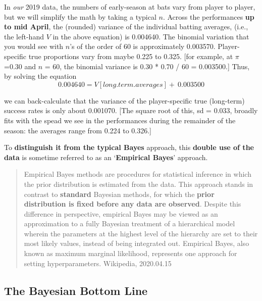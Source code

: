 \documentclass[]{book}
\begin{document}
In \emph{our} 2019 data, the numbers of early-season at bats vary from player to player, but we will simplify the math by taking a typical \(n\).
Across the performances \textbf{up to mid April}, the (rounded) variance of the individual batting averages, (i.e., the left-hand \(V\) in the above equation) is 0.004640. The binomial variation that you would see with \(n\)'s of the order of 60 is approximately 0.003570. Player-specific true proportions vary from maybe 0.225 to 0.325. {[}for example, at \(\pi\) =0.30 and \(n\) = 60, the binomial variance is 0.30 * 0.70 / 60 = 0.003500.{]} Thus,
by solving the equation
\[0.004640 =  V[long.term.averages] +  \  0.003500\]

we can back-calculate that the variance of the player-specific true (long-term) success rates is only about 0.001070. {[}The square root of this, sd = 0.033, broadly fits with the spead we see in the performances during the remainder of the season: the averages range from 0.224 to 0.326.{]}

To \textbf{distinguish it from the typical Bayes} approach, this \textbf{double use of the data} is sometime referred to as an `\textbf{Empirical Bayes}' approach.

\begin{quote}
Empirical Bayes methods are procedures for statistical inference in which the prior distribution is estimated from the data. This approach stands in contrast to \textbf{standard} Bayesian methods, for which the \textbf{prior distribution is fixed before any data are observed}. Despite this difference in perspective, empirical Bayes may be viewed as an approximation to a fully Bayesian treatment of a hierarchical model wherein the parameters at the highest level of the hierarchy are set to their most likely values, instead of being integrated out. Empirical Bayes, also known as maximum marginal likelihood, represents one approach for setting hyperparameters. Wikipedia, 2020.04.15
\end{quote}

\hypertarget{the-bayesian-bottom-line}{%
\subsection{The Bayesian Bottom Line}\label{the-bayesian-bottom-line}}
\end{document}
